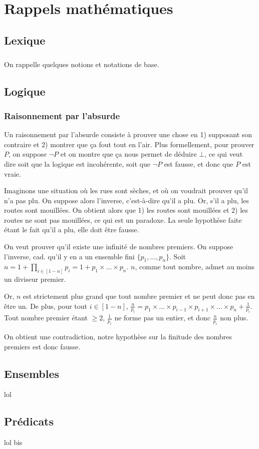 
\chapter{Rappels mathématiques}
\section{Lexique }

\paragraph{}On rappelle quelques notions et notations de base.

\section{Logique}

\subsection{Raisonnement par l'absurde}

Un raisonnement par l'absurde consiste à prouver une chose en 1) supposant son contraire et 2) montrer que ça fout tout en l'air. Plus formellement, pour prouver $P$, on suppose $\neg P$ et on montre que ça nous permet de déduire $\bot$, ce qui veut dire soit que la logique est incohérente, soit que $\neg P$ est fausse, et donc que $P$ est vraie.

\begin{example}
Imaginons une situation où les rues sont sèches, et où on voudrait prouver qu'il n'a pas plu. On suppose alors l'inverse, c'est-à-dire qu'il a plu. Or, s'il a plu, les routes sont mouillées. On obtient alors que 1) les routes sont mouillées et 2) les routes ne sont pas mouillées, ce qui est un paradoxe. La seule hypothèse faite étant le fait qu'il a plu, elle doit être fausse.
\end{example}

\begin{example}
On veut prouver qu'il existe une infinité de nombres premiers. On suppose l'inverse, cad. qu'il y en a un ensemble fini $\{p_1,...,p_n\}$. Soit $n = 1 + \prod_{i \in [1 - n]} p_i = 1 + p_1 \times ... \times p_n$. $n$, comme tout nombre, admet au moins un diviseur premier. 

Or, $n$ est strictement plus grand que tout nombre premier et ne peut donc pas en être un. De plus, pour tout $i \in [1 - n]$, $\frac{n}{p_i} = p_1 \times ... \times p_{i-1} \times p_{i+1} \times ... \times p_n + \frac{1}{p_i}$. Tout nombre premier étant $\geq 2$, $\frac{1}{p_i}$ ne forme pas un entier, et donc $\frac{n}{p_i}$ non plus.

On obtient une contradiction, notre hypothèse sur la finitude des nombres premiers est donc fausse.
\end{example}



\section{Ensembles}

lol

\section{Prédicats}

lol bis
